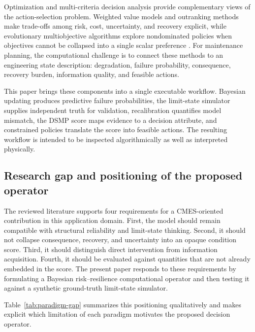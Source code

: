 \documentclass[cmes,article,submit,moreauthors,pdftex]{Definitions/tsp}
\begin{document}
Optimization and multi-criteria decision analysis provide complementary views of the action-selection problem. Weighted value models and outranking methods make trade-offs among risk, cost, uncertainty, and recovery explicit, while evolutionary multiobjective algorithms explore nondominated policies when objectives cannot be collapsed into a single scalar preference \cite{saaty2008,brans1985,roy1991,deb2002,coello2004,blank2020pymoo}. For maintenance planning, the computational challenge is to connect these methods to an engineering state description: degradation, failure probability, consequence, recovery burden, information quality, and feasible actions.

This paper brings these components into a single executable workflow. Bayesian updating produces predictive failure probabilities, the limit-state simulator supplies independent truth for validation, recalibration quantifies model mismatch, the DSMP score maps evidence to a decision attribute, and constrained policies translate the score into feasible actions. The resulting workflow is intended to be inspected algorithmically as well as interpreted physically.

\subsection{Research gap and positioning of the proposed operator}

The reviewed literature supports four requirements for a CMES-oriented contribution in this application domain. First, the model should remain compatible with structural reliability and limit-state thinking. Second, it should not collapse consequence, recovery, and uncertainty into an opaque condition score. Third, it should distinguish direct intervention from information acquisition. Fourth, it should be evaluated against quantities that are not already embedded in the score. The present paper responds to these requirements by formulating a Bayesian risk--resilience computational operator and then testing it against a synthetic ground-truth limit-state simulator.

Table~\ref{tab:paradigm-gap} summarizes this positioning qualitatively and makes explicit which limitation of each paradigm motivates the proposed decision operator.
\end{document}
